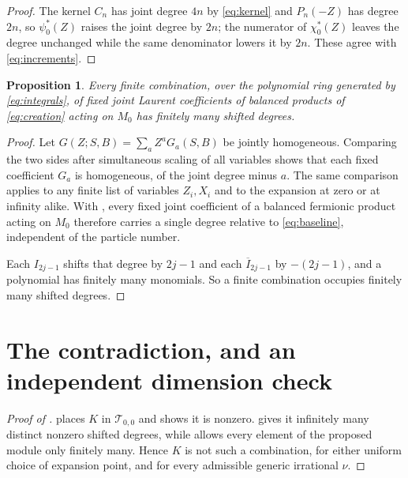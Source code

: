 \documentclass[11pt,reqno]{amsart}
\theoremstyle{plain}
\newtheorem{proposition}[theorem]{Proposition}
\theoremstyle{definition}
\theoremstyle{remark}
\numberwithin{equation}{section}
\begin{document}
\begin{proof}
  The kernel $C_n$ has joint degree $4n$ by \eqref{eq:kernel} and
  $P_n(-Z)$ has degree $2n$, so $\psi_0^*(Z)$ raises the joint degree by
  $2n$; the numerator of $\chi_0^*(Z)$ leaves the degree unchanged while the
  same denominator lowers it by $2n$. These agree with
  \eqref{eq:increments}.
\end{proof}

\begin{proposition}
  \label{prop:finite-support}
  Every finite combination, over the polynomial ring generated by
  \eqref{eq:integrals}, of fixed joint Laurent coefficients of balanced
  products of \eqref{eq:creation} acting on $M_0$ has finitely many shifted
  degrees.
\end{proposition}

\begin{proof}
  Let $G(Z;S,B)=\sum_aZ^aG_a(S,B)$ be jointly homogeneous. Comparing the two
  sides after simultaneous scaling of all variables shows that each fixed
  coefficient $G_a$ is homogeneous, of the joint degree minus $a$. The same
  comparison applies to any finite list of variables $Z_i,X_i$ and to the
  expansion at zero or at infinity alike. With , every
  fixed joint coefficient of a balanced fermionic product acting on $M_0$
  therefore carries a single degree relative to \eqref{eq:baseline},
  independent of the particle number.

  Each $I_{2j-1}$ shifts that degree by $2j-1$ and each
  $\overline I_{2j-1}$ by $-(2j-1)$, and a polynomial has finitely many
  monomials. So a finite combination occupies finitely many shifted degrees.
\end{proof}

\section{The contradiction, and an independent dimension check}
\label{sec:contradiction}

\begin{proof}[Proof of ]
   places $K$ in $\mathcal T_{0,0}$ and shows it is
  nonzero.  gives it infinitely many distinct nonzero
  shifted degrees, while  allows every element of
  the proposed module only finitely many. Hence $K$ is not such a
  combination, for either uniform choice of expansion point, and for every
  admissible generic irrational $\nu$.
\end{proof}
\end{document}
